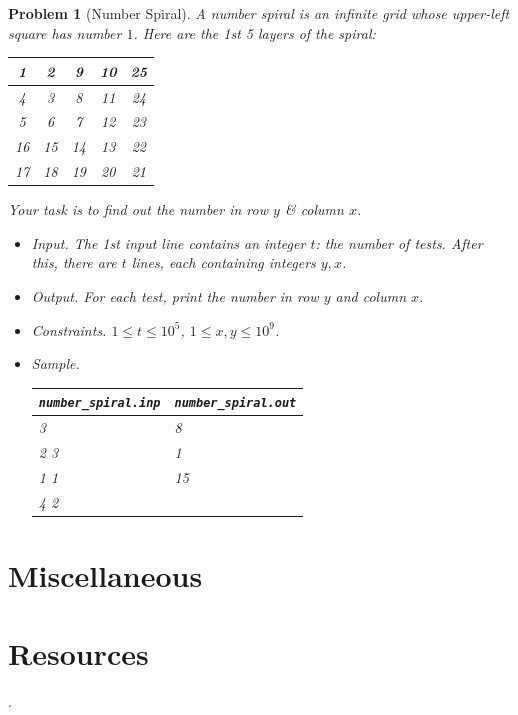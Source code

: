 \documentclass{article}
\newtheorem{problem}{Problem}
\begin{document}
\begin{problem}[Number Spiral]
	A \emph{number spiral} is an infinite grid whose upper-left square has number $1$. Here are the 1st 5 layers of the spiral:
	\begin{table}[H]
		\centering
		\begin{tabular}{|c|c|c|c|c|}
			\hline
			1 & 2 & 9 & 10 & 25 \\
			\hline
			4 & 3 & 8 & 11 & 24 \\
			\hline
			5 & 6 & 7 & 12 & 23 \\
			\hline
			16 & 15 & 14 & 13 & 22 \\
			\hline
			17 & 18 & 19 & 20 & 21 \\
			\hline
		\end{tabular}
	\end{table}
	Your task is to find out the number in row $y$ \& column $x$.
	\begin{itemize}
		\item {\sf Input.} The 1st input line contains an integer $t$: the number of tests. After this, there are $t$ lines, each containing integers $y,x$.
		\item {\sf Output.} For each test, print the number in row $y$ and column $x$.
		\item {\sf Constraints.} $1\le t\le10^5$, $1\le x,y\le10^9$.
		\item {\sf Sample.}
		\begin{table}[H]
			\centering
			\begin{tabular}{|l|l|}
				\hline
				\verb|number_spiral.inp| & \verb|number_spiral.out| \\
				\hline
				3 & 8 \\
				2 3 & 1 \\
				1 1 & 15 \\
				4 2 & \\
				\hline				
			\end{tabular}
		\end{table}
	\end{itemize}
\end{problem}


\section{Miscellaneous}

\section*{Resources}
\cite{TLGK_chuyen_Tin_quyen_1, TLGK_chuyen_Tin_quyen_2, TLGK_chuyen_Tin_quyen_3, Knuth1997, VietSTEM2021, VietSTEM2022}.


\printbibliography[heading=bibintoc]
	
\end{document}
